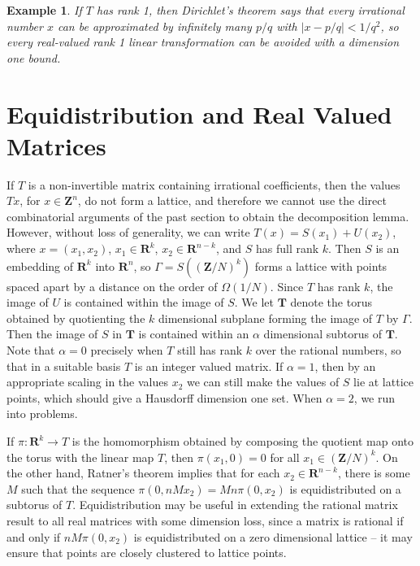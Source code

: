 \documentclass{report}
\theoremstyle{plain}
\newtheorem*{example}{Example}
\theoremstyle{plain}
\begin{document}
\begin{example}
    If $T$ has rank 1, then Dirichlet's theorem says that every irrational number $x$ can be approximated by infinitely many $p/q$ with $|x - p/q| < 1/q^2$, so every real-valued rank 1 linear transformation can be avoided with a dimension one bound.
\end{example}

\section{Equidistribution and Real Valued Matrices}

If $T$ is a non-invertible matrix containing irrational coefficients, then the values $Tx$, for $x \in \mathbf{Z}^n$, do not form a lattice, and therefore we cannot use the direct combinatorial arguments of the past section to obtain the decomposition lemma. However, without loss of generality, we can write $T(x) = S(x_1) + U(x_2)$, where $x = (x_1,x_2)$, $x_1 \in \mathbf{R}^k$, $x_2 \in \mathbf{R}^{n-k}$, and $S$ has full rank $k$. Then $S$ is an embedding of $\mathbf{R}^k$ into $\mathbf{R}^n$, so $\Gamma = S((\mathbf{Z}/N)^k)$ forms a lattice with points spaced apart by a distance on the order of $\Omega(1/N)$. Since $T$ has rank $k$, the image of $U$ is contained within the image of $S$. We let $\mathbf{T}$ denote the torus obtained by quotienting the $k$ dimensional subplane forming the image of $T$ by $\Gamma$. Then the image of $S$ in $\mathbf{T}$ is contained within an $\alpha$ dimensional subtorus of $\mathbf{T}$. Note that $\alpha = 0$ precisely when $T$ still has rank $k$ over the rational numbers, so that in a suitable basis $T$ is an integer valued matrix. If $\alpha = 1$, then by an appropriate scaling in the values $x_2$ we can still make the values of $S$ lie at lattice points, which should give a Hausdorff dimension one set. When $\alpha = 2$, we run into problems.

If $\pi: \mathbf{R}^k \to T$ is the homomorphism obtained by composing the quotient map onto the torus with the linear map $T$, then $\pi(x_1,0) = 0$ for all $x_1 \in (\mathbf{Z}/N)^k$. On the other hand, Ratner's theorem implies that for each $x_2 \in \mathbf{R}^{n-k}$, there is some $M$ such that the sequence $\pi(0, nMx_2) = Mn \pi(0, x_2)$ is equidistributed on a subtorus of $T$. Equidistribution may be useful in extending the rational matrix result to all real matrices with some dimension loss, since a matrix is rational if and only if $n M \pi(0, x_2)$ is equidistributed on a zero dimensional lattice -- it may ensure that points are closely clustered to lattice points.
\end{document}
